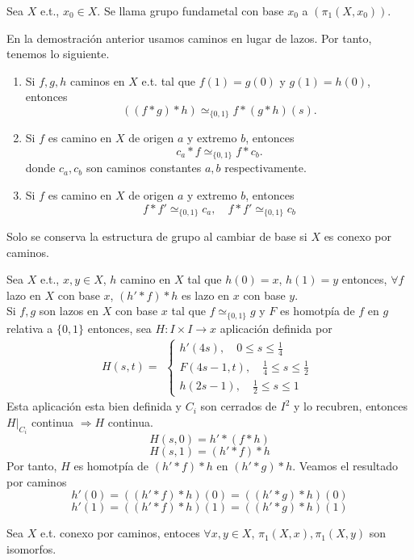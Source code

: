 \begin{defn}
  Sea $X$ e.t., $x_{0} \in X$. Se llama grupo fundametal con base $x_{0}$ a $(\pi_{1}(X, x_{0}))$.
\end{defn}

\begin{obs}
  En la demostración anterior usamos caminos en lugar de lazos. Por tanto, tenemos lo siguiente.
  \begin{enumerate}[label=(\roman*)]
    \item Si $f,g,h$ caminos en $X$ e.t. tal que $f(1) = g(0)$ y $g(1) = h(0)$, entonces
      \[ 
        ((f*g) * h) \simeq_{\{ 0,1 \}} f * ( g* h)(s).
      \] 
    \item Si $f$ es camino en $X$ de origen $a$ y extremo $b$, entonces
      \[ 
        c_{a} * f \simeq_{\{ 0, 1 \}} f * c_{b}.
      \] 
      donde $c_{a}, c_{b}$ son caminos constantes $a, b$ respectivamente.
    \item Si $f$ es camino en $X$ de origen $a$ y extremo $b$, entonces
      \[ 
        f * f' \simeq_{\{ 0, 1 \}} c_{a}, \quad f * f' \simeq_{\{ 0, 1 \}} c_{b}
      \] 
  \end{enumerate}
\end{obs}

\begin{obs}
  Solo se conserva la estructura de grupo al cambiar de base si $X$ es conexo por caminos.
\end{obs}

\begin{obs}
  Sea $X$ e.t., $x, y \in X$, $h$ camino en $X$ tal que $h(0) = x$, $h(1) = y$ entonces, $\forall f$ lazo en $X$ con base $x$, $(h' * f) * h$ es lazo en $x$ con base $y$. \\

  Si $f,g$ son lazos en $X$ con base $x$ tal que $f \simeq_{\{ 0, 1 \}} g$ y $F$ es homotpía de $f$ en $g$ relativa a $\{ 0, 1 \}$ entonces, sea $H : I \times I \to x$ aplicación definida por
  \[ 
    H(s,t) =
    \begin{aligned}
      \begin{cases}
        h'(4s), \quad 0 \leq s \leq \frac{1}{4} \\
        F(4s - 1, t), \quad \frac{1}{4} \leq s \leq \frac{1}{2} \\
        h(2s - 1), \quad \frac{1}{2} \leq s \leq 1
      \end{cases}
    \end{aligned}
  \] 
  Esta aplicación esta bien definida y $C_{i}$ son cerrados de $I^{2}$ y lo recubren, entonces $H|_{C_{i}}$ continua $\Rightarrow H$ continua.
  \[ 
    H(s,0) = h' * (f * h)
  \] 
  \[ 
    H(s,1) = (h' * f) * h 
  \] 
  Por tanto, $H$ es homotpía de $(h' * f) * h$ en $(h' * g) * h$. Veamos el resultado por caminos
  \[ 
    h'(0) = ((h' * f) * h)(0) = ((h' * g) * h)(0) 
  \] 
  \[ 
    h'(1) = ((h' * f) * h)(1) = ((h' * g) * h)(1)
  \] 
\end{obs} 

\begin{prop}
  Sea $X$ e.t. conexo por caminos, entoces $\forall x, y \in X$, $\pi_{1}(X,x), \pi_{1}(X, y)$ son isomorfos.
\end{prop}
